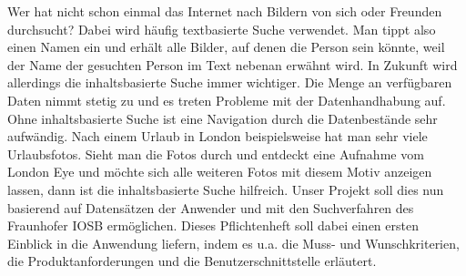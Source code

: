 Wer hat nicht schon einmal das Internet nach Bildern von sich oder Freunden durchsucht? Dabei wird häufig textbasierte Suche verwendet. Man tippt also einen Namen ein und erhält alle Bilder, auf denen die Person sein könnte, weil der Name der gesuchten Person im Text nebenan erwähnt wird. 
\newline
In Zukunft wird allerdings die inhaltsbasierte Suche immer wichtiger. Die Menge an verfügbaren Daten nimmt stetig zu und es treten Probleme mit der Datenhandhabung auf. Ohne inhaltsbasierte Suche ist eine Navigation durch die Datenbestände sehr aufwändig.
Nach einem Urlaub in London beispielsweise hat man sehr viele Urlaubsfotos. Sieht man die Fotos durch und entdeckt eine Aufnahme vom London Eye und möchte sich alle weiteren Fotos mit diesem Motiv anzeigen lassen, dann ist die inhaltsbasierte Suche hilfreich.
\newline
Unser Projekt soll dies nun basierend auf Datensätzen der Anwender und mit den \gls{Suchverfahren} des Fraunhofer IOSB ermöglichen.
\newline
Dieses Pflichtenheft soll dabei einen ersten Einblick in die Anwendung liefern, indem es u.a. die Muss- und Wunschkriterien, die Produktanforderungen und die Benutzerschnittstelle erläutert.
\pagebreak
